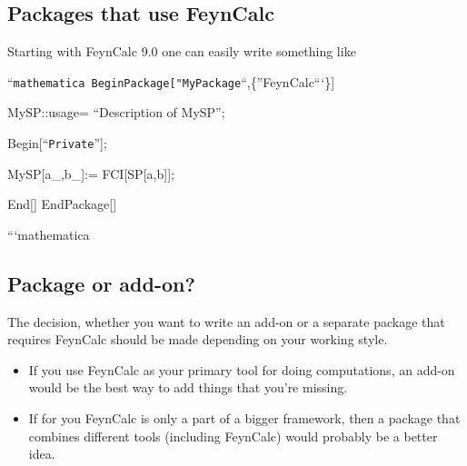 \documentclass[../FeynCalcManual.tex]{subfiles}
\begin{document}
\subsection{Packages that use
FeynCalc}\label{packages-that-use-feyncalc}

Starting with FeynCalc 9.0 one can easily write something like

``\texttt{mathematica BeginPackage[\allowbreak{}"MyPackage}``,\{''FeynCalc```\}{]}

MySP::usage= ``Description of MySP'';

Begin{[}``\texttt{Private}''{]};

MySP{[}a\_,b\_{]}:= FCI{[}SP{[}a,b{]}{]};

End{[}{]} EndPackage{[}{]}

```mathematica

\subsection{Package or add-on?}\label{package-or-add-on}

The decision, whether you want to write an add-on or a separate package
that requires FeynCalc should be made depending on your working style.

\begin{itemize}
\tightlist
\item
  If you use FeynCalc as your primary tool for doing computations, an
  add-on would be the best way to add things that you're missing.
\item
  If for you FeynCalc is only a part of a bigger framework, then a
  package that combines different tools (including FeynCalc) would
  probably be a better idea.
\end{itemize}
\end{document}

